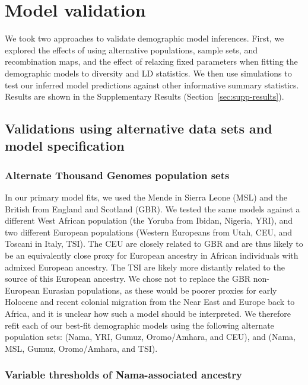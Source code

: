 \documentclass[]{article}
\begin{document}
\section{Model validation}

We took two approaches to validate demographic model inferences. First, we
explored the effects of using alternative populations, sample sets, and
recombination maps, and the effect of relaxing fixed parameters when fitting
the demographic models to diversity and LD statistics. We then use simulations
to test our inferred model predictions against other informative summary
statistics. Results are shown in the Supplementary Results
(Section~\ref{sec:supp-results}).

\subsection{Validations using alternative data sets and model specification}

\subsubsection{Alternate Thousand Genomes population sets}

In our primary model fits, we used the Mende in Sierra Leone (MSL) and the
British from England and Scotland (GBR). We tested the same models against a
different West African population (the Yoruba from Ibidan, Nigeria, YRI), and
two different European populations (Western Europeans from Utah, CEU, and
Toscani in Italy, TSI). The CEU are closely related to GBR and are thus likely
to be an equivalently close proxy for European ancestry in African individuals
with admixed European ancestry. The TSI are likely more distantly related to
the source of this European ancestry. We chose not to replace the GBR
non-European Eurasian populations, as these would be poorer proxies for early
Holocene and recent colonial migration from the Near East and Europe back to
Africa, and it is unclear how such a model should be interpreted. We therefore
refit each of our best-fit demographic models using the following alternate
population sets: (Nama, YRI, Gumuz, Oromo/Amhara, and CEU), and (Nama, MSL,
Gumuz, Oromo/Amhara, and TSI).

\subsubsection{Variable thresholds of Nama-associated ancestry}
\end{document}
